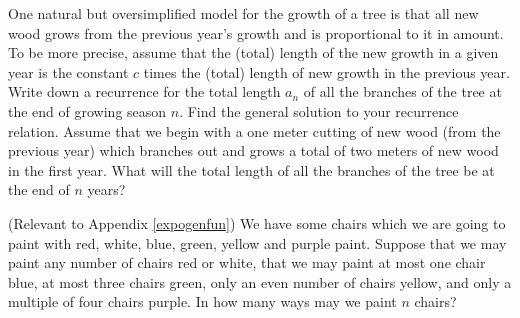 \item One natural but oversimplified model for the growth of a tree is
that all new wood grows  from the previous year's growth and is
proportional to it in amount.  To be more precise, assume that the
(total) length of the new growth in a given year is the constant $c$
times the (total) length of new growth in the previous year.  Write down
a recurrence for the total length $a_n$ of all the branches of the tree
at the end of growing season
$n$.  Find the general solution to your recurrence relation.  Assume that
we begin with a one meter cutting of new wood (from the previous year) which
branches out and grows a total of two meters of new wood in the first year. 
What will the total length of all the branches of the tree be at the end of $n$
years?

\itemi (Relevant to Appendix \ref{expogenfun}) We have some chairs which we are
going to paint with red, white, blue, green, yellow and purple paint.  Suppose
that we may paint any number of chairs red or white, that we may paint at most
one chair blue, at most three chairs green, only an even number of chairs
yellow, and only a multiple of four chairs purple.  In how many ways may we
paint $n$ chairs?

